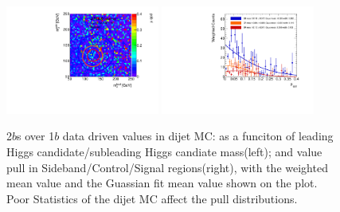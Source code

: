 \begin{figure}[htbp!]
\begin{center}
\includegraphics[width=0.45\textwidth,angle=-90]{figures/boosted/AppendixMuqcdstudy/QCD_TwoTag_split_Incl_mH0H1.pdf}
\includegraphics[width=0.45\textwidth,angle=-90]{figures/boosted/AppendixMuqcdstudy/QCD_TwoTag_split_Incl_mH0H1_pull.pdf}
\caption{2$b$s over 1$b$ data driven \muqcd values in dijet MC: \muqcd as a funciton of leading Higgs candidate/subleading Higgs candiate mass(left); and \muqcd value pull in Sideband/Control/Signal regions(right), with the weighted mean value and the Guassian fit mean value shown on the plot. Poor Statistics of the dijet MC affect the pull distributions.}
\label{fig:app-muqcd-2bs-qcd}
\end{center}
\end{figure}

